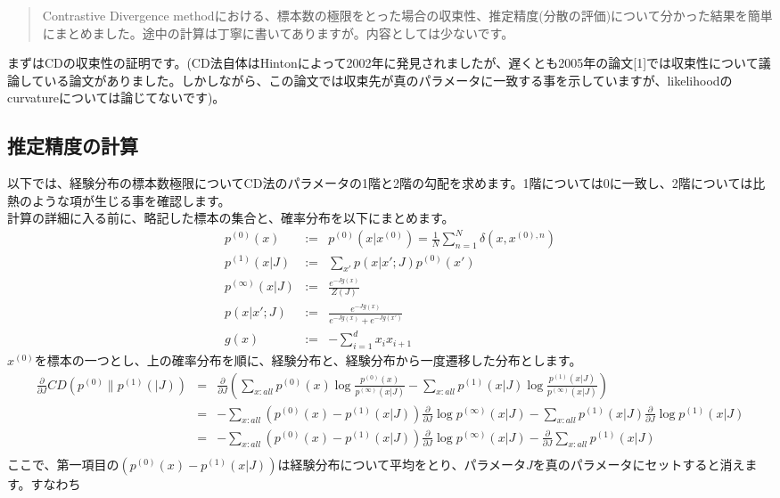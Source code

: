 \documentclass[11pt]{article}
\begin{document}
\begin{abstract}
Contrastive Divergence methodにおける、標本数の極限をとった場合の収束性、推定精度(分散の評価)について分かった結果を簡単にまとめました。途中の計算は丁寧に書いてありますが。内容としては少ないです。
\end{abstract}
まずはCDの収束性の証明です。(CD法自体はHintonによって2002年に発見されましたが、遅くとも2005年の論文[1]では収束性について議論している論文がありました。しかしながら、この論文では収束先が真のパラメータに一致する事を示していますが、likelihoodのcurvatureについては論じてないです)。\\

\subsection{推定精度の計算}
以下では、経験分布の標本数極限についてCD法のパラメータの1階と2階の勾配を求めます。1階については0に一致し、2階については比熱のような項が生じる事を確認します。\\
計算の詳細に入る前に、略記した標本の集合と、確率分布を以下にまとめます。\\
\begin{eqnarray}
	p^{(0)}(x)&:=&p^{(0)}(x|x^{(0)})=\frac{1}{N}\sum_{n=1}^{N}\delta(x,x^{(0),n})\\
	p^{(1)}(x|J)&:=&\sum_{x'}p(x|x';J)p^{(0)}(x')\\
	p^{(\infty)}(x|J)&:=&\frac{e^{-Jg(x)}}{Z(J)}\\
	p(x|x';J)&:=&\frac{e^{-Jg(x)}}{e^{-Jg(x)}+e^{-Jg(x')}}\\
	g(x)&:=&-\sum_{i=1}^d x_i x_{i+1}
\end{eqnarray}
$x^{(0)}$を標本の一つとし、上の確率分布を順に、経験分布と、経験分布から一度遷移した分布とします。
\begin{eqnarray}
	\frac{\partial}{\partial J}CD(p^{(0)}\|p^{(1)}(|J))&=&\frac{\partial}{\partial J}(\sum_{x:all}p^{(0)}(x)\log{\frac{p^{(0)}(x)}{p^{(\infty)}(x|J)}}-\sum_{x:all}p^{(1)}(x|J)\log{\frac{p^{(1)}(x|J)}{p^{(\infty)}(x|J)}})\\
&=&-\sum_{x:all}(p^{(0)}(x)-p^{(1)}(x|J))\frac{\partial}{\partial J}\log p^{(\infty)}(x|J)-\sum_{x:all}p^{(1)}(x|J)\frac{\partial}{\partial J}\log p^{(1)}(x|J)\\
&=&-\sum_{x:all}(p^{(0)}(x)-p^{(1)}(x|J))\frac{\partial}{\partial J}\log p^{(\infty)}(x|J)-\frac{\partial}{\partial J}\sum_{x:all}p^{(1)}(x|J)\\
\end{eqnarray}
ここで、第一項目の$(p^{(0)}(x)-p^{(1)}(x|J))$は経験分布について平均をとり、パラメータ$J$を真のパラメータにセットすると消えます。すなわち
\end{document}
